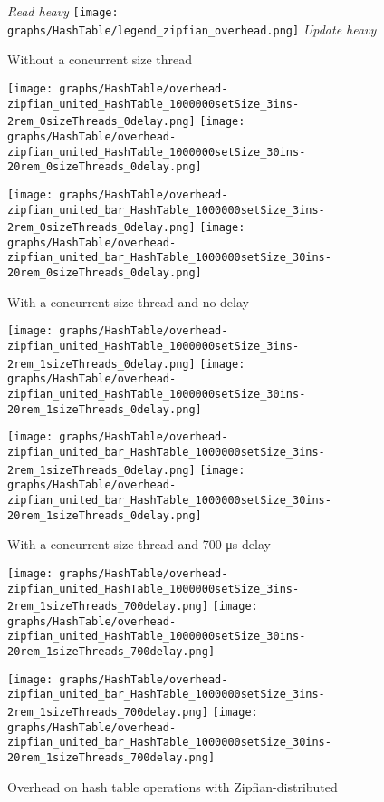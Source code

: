 \documentclass{article}
\begin{document}
\begin{figure*}[htbp]
	\centering
	\medskip
	\textit{Read heavy}\quad\quad
	\texttt{[image: graphs/HashTable/legend\_zipfian\_overhead.png]}\quad\quad
	\textit{Update heavy}\par
	\medskip
	Without a concurrent size thread\par
        \smallskip
	\texttt{[image: graphs/HashTable/overhead-zipfian\_united\_HashTable\_1000000setSize\_3ins-2rem\_0sizeThreads\_0delay.png]}\hspace{2.5em}
	\texttt{[image: graphs/HashTable/overhead-zipfian\_united\_HashTable\_1000000setSize\_30ins-20rem\_0sizeThreads\_0delay.png]}\par
	\texttt{[image: graphs/HashTable/overhead-zipfian\_united\_bar\_HashTable\_1000000setSize\_3ins-2rem\_0sizeThreads\_0delay.png]}\hspace{2.5em}
	\texttt{[image: graphs/HashTable/overhead-zipfian\_united\_bar\_HashTable\_1000000setSize\_30ins-20rem\_0sizeThreads\_0delay.png]}\par
	\medskip
	With a concurrent size thread and no delay\par
	\texttt{[image: graphs/HashTable/overhead-zipfian\_united\_HashTable\_1000000setSize\_3ins-2rem\_1sizeThreads\_0delay.png]}\hspace{2.5em}
	\texttt{[image: graphs/HashTable/overhead-zipfian\_united\_HashTable\_1000000setSize\_30ins-20rem\_1sizeThreads\_0delay.png]}\par
	\texttt{[image: graphs/HashTable/overhead-zipfian\_united\_bar\_HashTable\_1000000setSize\_3ins-2rem\_1sizeThreads\_0delay.png]}\hspace{2.5em}
	\texttt{[image: graphs/HashTable/overhead-zipfian\_united\_bar\_HashTable\_1000000setSize\_30ins-20rem\_1sizeThreads\_0delay.png]}\par
	\medskip
	With a concurrent size thread and 700 \si{\micro\second} delay\par
	\texttt{[image: graphs/HashTable/overhead-zipfian\_united\_HashTable\_1000000setSize\_3ins-2rem\_1sizeThreads\_700delay.png]}\hspace{2.5em}
	\texttt{[image: graphs/HashTable/overhead-zipfian\_united\_HashTable\_1000000setSize\_30ins-20rem\_1sizeThreads\_700delay.png]}\par
	\texttt{[image: graphs/HashTable/overhead-zipfian\_united\_bar\_HashTable\_1000000setSize\_3ins-2rem\_1sizeThreads\_700delay.png]}\hspace{2.5em}
	\texttt{[image: graphs/HashTable/overhead-zipfian\_united\_bar\_HashTable\_1000000setSize\_30ins-20rem\_1sizeThreads\_700delay.png]}\par
	\caption{Overhead on hash table operations with Zipfian-distributed}
	\label{fig:HashTable zipfian overhead}
\end{figure*}
\end{document}
